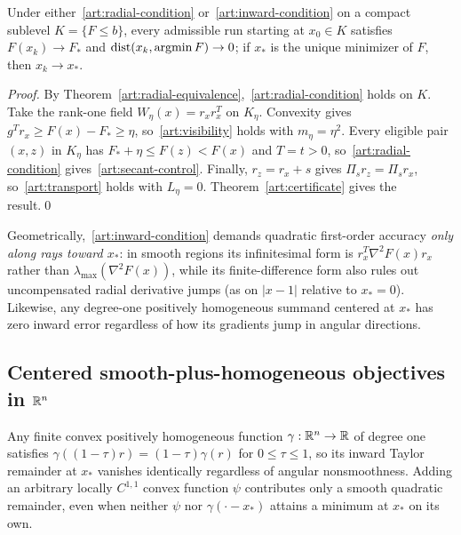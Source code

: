 \begin{corollary}\label{art:radial-convergence}
Under either~\eqref{art:radial-condition} or~\eqref{art:inward-condition} on a
compact sublevel $K=\{F\le b\}$, every admissible run starting at $x_0\in K$
satisfies $F(x_k)\to F_*$ and $\operatorname{dist}(x_k,\operatorname{argmin} F)\to0$; if $x_*$ is the unique
minimizer of $F$, then $x_k\to x_*$.
\end{corollary}
\begin{proof}
By Theorem~\ref{art:radial-equivalence},~\eqref{art:radial-condition} holds on
$K$. Take the rank-one field $W_\eta(x)=r_xr_x^T$ on $K_\eta$. Convexity gives
$g^Tr_x\ge F(x)-F_*\ge\eta$, so~\eqref{art:visibility} holds with $m_\eta=\eta^2$.
Every eligible pair $(x,z)$ in $K_\eta$ has $F_*+\eta\le F(z)<F(x)$ and $T=t>0$,
so~\eqref{art:radial-condition} gives~\eqref{art:secant-control}. Finally,
$r_z=r_x+s$ gives $\Pi_sr_z=\Pi_sr_x$, so~\eqref{art:transport} holds with
$L_\eta=0$. Theorem~\ref{art:certificate} gives the result.\qed
\end{proof}

Geometrically,~\eqref{art:inward-condition} demands quadratic first-order
accuracy \emph{only along rays toward $x_*$}: in smooth regions its
infinitesimal form is $r_x^T\nabla^2F(x)r_x$ rather than $\lambda_{\max}(\nabla^2F(x))$,
while its finite-difference form also rules out uncompensated radial derivative
jumps (as on $|x-1|$ relative to $x_*=0$). Likewise, any degree-one positively
homogeneous summand centered at $x_*$ has zero inward error regardless of how
its gradients jump in angular directions.

\subsection{Centered smooth-plus-homogeneous objectives in $\mathbb R^n$}

Any finite convex positively homogeneous function $\gamma:\mathbb R^n\to\mathbb R$ of degree
one satisfies $\gamma((1-\tau)r)=(1-\tau)\gamma(r)$ for $0\le\tau\le1$, so its
inward Taylor remainder at $x_*$ vanishes identically regardless of angular
nonsmoothness. Adding an arbitrary locally $C^{1,1}$ convex function $\psi$
contributes only a smooth quadratic remainder, even when neither $\psi$ nor
$\gamma(\cdot-x_*)$ attains a minimum at $x_*$ on its own.

